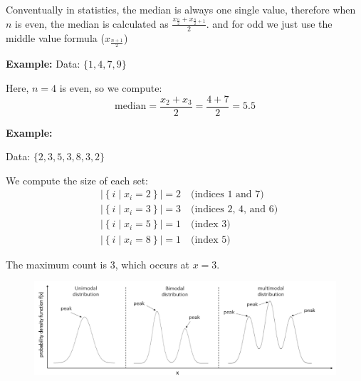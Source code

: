 \documentclass{article}
\begin{document}

Conventually in statistics, the median is always one single value, therefore when $n$ is even, the median is calculated as $\frac{x_{\frac{n}{2}} + x_{\frac{n}{2}+1}}{2}$. and for odd we just use the middle value formula ($x_{\frac{n+1}{2}}$)

\textbf{Example:}
Data: $\{1, 4, 7, 9\}$

Here, $n = 4$ is even, so we compute:
\[
\text{median} = \frac{x_2 + x_3}{2} = \frac{4 + 7}{2} = \boxed{5.5}
\]


\textbf{Example:}

Data: $\{2, 3, 5, 3, 8, 3, 2\}$

We compute the size of each set:
\begin{align*}
&\left|\left\{ i \mid x_i = 2 \right\}\right| = 2 \quad \text{(indices 1 and 7)} \\
&\left|\left\{ i \mid x_i = 3 \right\}\right| = 3 \quad \text{(indices 2, 4, and 6)} \\
&\left|\left\{ i \mid x_i = 5 \right\}\right| = 1 \quad \text{(index 3)} \\
&\left|\left\{ i \mid x_i = 8 \right\}\right| = 1 \quad \text{(index 5)}
\end{align*}

The maximum count is $3$, which occurs at $x = 3$.


\begin{figure}[H]
    \includegraphics[width=0.5\linewidth]{images/unimodal_multimodal.png}
\end{figure}
\end{document}
